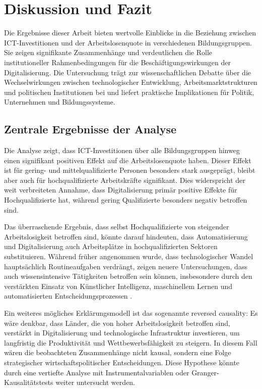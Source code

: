 
\section{Diskussion und Fazit}

Die Ergebnisse dieser Arbeit bieten wertvolle Einblicke in die Beziehung zwischen 
\ac{ICT}-Investitionen und der Arbeitslosenquote in verschiedenen Bildungsgruppen. Sie 
zeigen signifikante Zusammenhänge und verdeutlichen die Rolle institutioneller 
Rahmenbedingungen für die Beschäftigungswirkungen der Digitalisierung. Die Untersuchung 
trägt zur wissenschaftlichen Debatte über die Wechselwirkungen zwischen technologischer 
Entwicklung, Arbeitsmarktstrukturen und politischen Institutionen bei und liefert 
praktische Implikationen für Politik, Unternehmen und Bildungssysteme.

\subsection{Zentrale Ergebnisse der Analyse}

Die Analyse zeigt, dass \ac{ICT}-Investitionen über alle Bildungsgruppen hinweg einen 
signifikant positiven Effekt auf die Arbeitslosenquote haben. Dieser Effekt ist für 
gering- und mittelqualifizierte Personen besonders stark ausgeprägt, bleibt aber auch für 
hochqualifizierte Arbeitskräfte signifikant. Dies widerspricht der weit verbreiteten 
Annahme, dass Digitalisierung primär positive Effekte für Hochqualifizierte hat, während 
gering Qualifizierte besonders negativ betroffen sind. 

Das überraschende Ergebnis, dass selbst Hochqualifizierte von steigender Arbeitslosigkeit 
betroffen sind, könnte darauf hindeuten, dass Automatisierung und Digitalisierung auch 
Arbeitsplätze in hochqualifizierten Sektoren substituieren. Während früher angenommen wurde, 
dass technologischer Wandel hauptsächlich Routineaufgaben verdrängt, zeigen neuere 
Untersuchungen, dass auch wissensintensive Tätigkeiten betroffen sein können, insbesondere 
durch den verstärkten Einsatz von Künstlicher Intelligenz, maschinellem Lernen und 
automatisierten Entscheidungsprozessen \parencite[vgl.][S. 3-5]{brynjolfsson2014thesecond}.

Ein weiteres mögliches Erklärungsmodell ist das sogenannte reversed causality: Es wäre denkbar, 
dass Länder, die von hoher Arbeitslosigkeit betroffen sind, verstärkt in Digitalisierung und 
technologische Infrastruktur investieren, um langfristig die Produktivität und Wettbewerbsfähigkeit 
zu steigern. In diesem Fall wären die beobachteten Zusammenhänge nicht kausal, sondern eine Folge 
strategischer wirtschaftspolitischer Entscheidungen. Diese Hypothese könnte durch eine vertiefte Analyse 
mit Instrumentalvariablen oder Granger-Kausalitätstests weiter untersucht werden.

